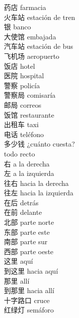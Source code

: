 药店 \quad farmacia\\
火车站 \quad estación de tren\\
银 \quad banco\\
大使馆 \quad embajada\\
汽车站 \quad estación de bus\\
飞机场 \quad aeropuerto\\
饭店 \quad hotel\\
医院 \quad hospital\\
警察 \quad policía\\
警察局 \quad comisaría\\
邮局 \quad correos\\
饭馆 \quad restaurante\\
出租车 \quad taxi\\
电话 \quad teléfono\\
多少钱 \quad ¿cuánto cuesta?\\
 \quad todo recto\\
右 \quad a la derecha\\
左 \quad a la izquierda\\
往右 \quad hacia la derecha\\
往左 \quad hacia la izquierda\\
在后 \quad detrás\\
在前 \quad delante\\
北部 \quad parte norte\\
东部 \quad parte este\\
南部 \quad parte sur\\
西部 \quad parte oeste\\
这里 \quad aquí\\
到这里 \quad hacia aquí\\
那里 \quad allí\\
到那里 \quad hacia allí\\
十字路口 \quad cruce\\
红绿灯 \quad semáforo\\
